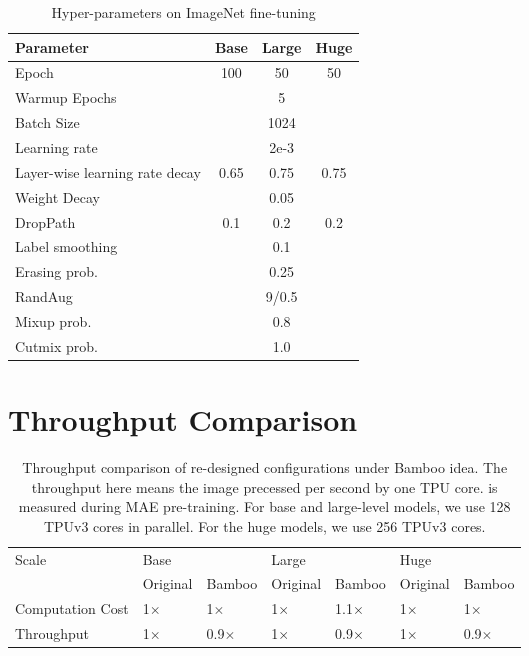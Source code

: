 \documentclass{article}
\theoremstyle{plain}
\theoremstyle{definition}
\theoremstyle{remark}
\begin{document}
\begin{table}[ht]
\caption{Hyper-parameters on ImageNet fine-tuning}
\label{tbl-hyper-parameter-pre-train}
\vskip 0.15in
\begin{center}
\begin{tabular}{l|ccc}
\toprule
Parameter                  & Base  & Large & Huge   \\ \midrule
Epoch                     & 100     & 50  & 50    \\
Warmup Epochs             &      & 5    &        \\
Batch Size                &    & 1024  &       \\
Learning rate             &    & 2e-3  &    \\
Layer-wise learning rate decay & 0.65  & 0.75 & 0.75  \\
Weight Decay              &     & 0.05 &   \\
DropPath                  & 0.1   & 0.2 & 0.2    \\ 
Label smoothing           &     & 0.1  &       \\
Erasing prob.               &     & 0.25  &     \\
RandAug               &   & 9/0.5 &       \\
Mixup prob.               &    & 0.8 &       \\
Cutmix prob.               &    & 1.0 &       \\ \bottomrule
\end{tabular}
\end{center}
\vskip -0.1in
\end{table}


\section{Throughput Comparison}\label{appendix:throughput}


\begin{table*}[ht]
\caption{Throughput comparison of re-designed configurations under Bamboo idea. The throughput here means the image precessed per second by one TPU core. is measured during MAE pre-training. For base and large-level models, we use 128 TPUv3 cores in parallel. For the huge models, we use 256 TPUv3 cores.}
\vspace{5pt}
\centering
\begin{tabular}{l ll ll ll}
\toprule 
Scale                  & \multicolumn{2}{l}{Base} & \multicolumn{2}{l}{Large} & \multicolumn{2}{l}{Huge} \\  \cmidrule(lr){2-3} \cmidrule(lr){4-5}\cmidrule(lr){6-7}
                 & Original & Bamboo & Original & Bamboo & Original & Bamboo  \\ \midrule
Computation Cost  & 1$\times$    & 1$\times$  & 1$\times$    & 1.1$\times$ & 1$\times$    & 1$\times$   \\ 
Throughput  & 1$\times$    & 0.9$\times$  & 1$\times$    & 0.9$\times$ & 1$\times$    & 0.9$\times$   \\ \bottomrule
\end{tabular}
\vspace{-0.3cm}
\label{tbl:throughput}
\end{table*}
\end{document}
